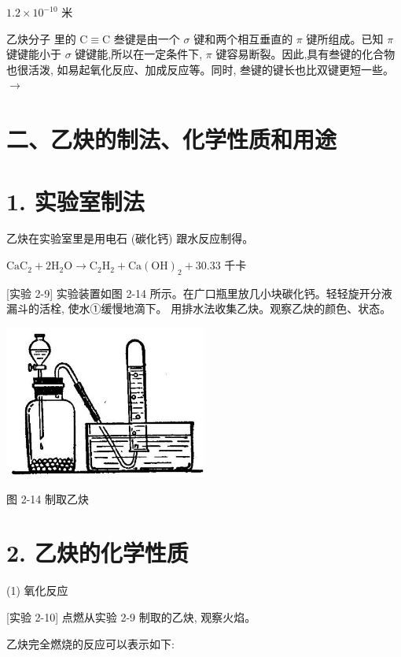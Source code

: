 \documentclass[10pt]{article}
\begin{document}
\({1.2} \times {10}^{-{10}}\) 米

乙炔分子 里的 \(\mathrm{C} \equiv \mathrm{C}\) 叁键是由一个 \(\sigma\) 键和两个相互垂直的 \(\pi\) 键所组成。已知 \(\pi\) 键键能小于 \(\sigma\) 键键能,所以在一定条件下, \(\pi\) 键容易断裂。因此,具有叁键的化合物也很活泼, 如易起氧化反应、加成反应等。同时, 叁键的键长也比双键更短一些。 \(\rightarrow\)

\section*{二、乙炔的制法、化学性质和用途}

\section*{1. 实验室制法}

乙炔在实验室里是用电石 (碳化钙) 跟水反应制得。

\({\mathrm{{CaC}}}_{2} + 2{\mathrm{H}}_{2}\mathrm{O} \rightarrow {\mathrm{C}}_{2}{\mathrm{H}}_{2} + \mathrm{{Ca}}{\left( \mathrm{{OH}}\right) }_{2} + {30.33}\) 千卡

[实验 2-9] 实验装置如图 2-14 所示。在广口瓶里放几小块碳化钙。轻轻旋开分液漏斗的活栓, 使水①缓慢地滴下。 用排水法收集乙炔。观察乙炔的颜色、状态。

\begin{center}
\includegraphics[max width=0.5\textwidth]{images/01912d16-be99-77bb-9535-4f3ed8d9946f_79_711183.jpg}
\end{center}

图 2-14 制取乙炔

\section*{2. 乙炔的化学性质}

(1) 氧化反应

[实验 2-10] 点燃从实验 2-9 制取的乙炔, 观察火焰。

乙炔完全燃烧的反应可以表示如下:
\end{document}
